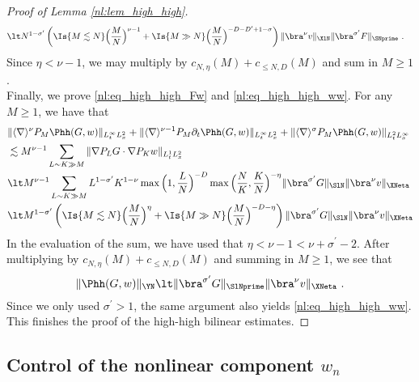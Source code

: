 \documentclass[11pt]{article}
\begin{document}
\begin{proof}[Proof of Lemma \ref{nl:lem_high_high}]
\begin{align*}
&\lt N^{1-\sigma^\prime} \left( \Is{M\lesssim N} \Big( \frac{M}{N} \Big)^{\nu-1} + \Is{M\gg N} \Big( \frac{M}{N} \Big)^{-D-D^\prime+1-\sigma} \right)  \| \bra^{\nu} v \|_{\XlN} \| \bra^{\sigma^\prime} F \|_{\SNprime}~. 
\end{align*}
Since \( \eta < \nu-1 \), we may multiply by \( c_{N,\eta}(M) + c_{\leq N,D}(M) \) and sum in \( M \geq 1\). \\
Finally, we prove \eqref{nl:eq_high_high_Fw} and \eqref{nl:eq_high_high_ww}. For any \( M \geq 1 \), we have that 
\begin{align*}
&\| \langle \nabla \rangle^{\nu} P_M \Phh(G,w) \|_{L_t^\infty L_x^2}+\| \langle \nabla \rangle^{\nu-1} P_M \partial_t \Phh(G,w) \|_{L_t^\infty L_x^2} + \| \langle \nabla \rangle^{\sigma} P_M \Phh(G,w) \|_{L_t^2 L_x^\infty}\\
&\lesssim M^{\nu-1} \sum_{L\sim K \gg M} \| \nabla P_L G\cdot \nabla P_K w \|_{L_t^1L_x^2}\\
&\lt M^{\nu-1} \sum_{L\sim K\gg M} L^{1-\sigma^\prime} K^{1-\nu} \max\Big( 1,\frac{L}{N} \Big)^{-D} \max\Big( \frac{N}{K},\frac{K}{N} \Big)^{-\eta} \| \bra^{\sigma^\prime} G \|_{\SlN} \| \bra^\nu v \|_{\XNeta} \\
&\lt M^{1-\sigma^\prime} \left( \Is{M\lesssim N} \Big( \frac{M}{N} \Big)^{\eta} + \Is{M\gg N} \Big ( \frac{M}{N} \Big)^{-D-\eta} \right) \| \bra^{\sigma^\prime} G \|_{\SlN} \| \bra^\nu v \|_{\XNeta}
\end{align*}
In the evaluation of the sum, we have used that \( \eta < \nu-1 < \nu + \sigma^\prime - 2 \). After multiplying by \( c_{N,\eta}(M)+ c_{\leq N,D}(M) \) and summing in \( M \geq 1 \), we see that 
\begin{equation*}
\| \Phh(G,w) \|_{\YN} \lt    \| \bra^{\sigma^\prime} G \|_{\SlNprime} \| \bra^\nu v \|_{\XNeta}~. 
\end{equation*}
Since we only used \( \sigma^\prime > 1 \), the same argument also yields \eqref{nl:eq_high_high_ww}. This finishes the proof of the high-high bilinear estimates. 
\end{proof}

\subsection{Control of the nonlinear component \( w_n \)}
\end{document}
